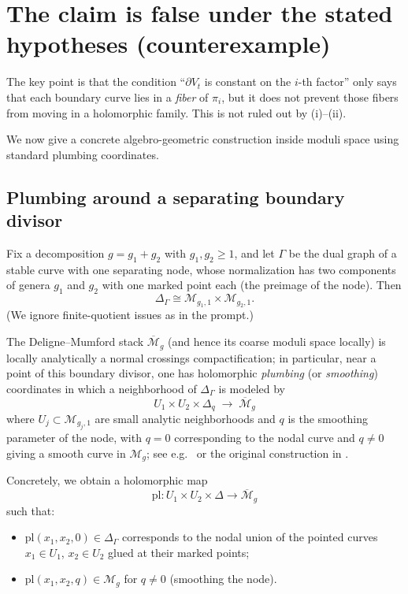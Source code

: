 \documentclass[11pt]{article}
\newcommand{\Mg}{\mathcal M_g}
\newcommand{\Mgn}[2]{\mathcal M_{#1,#2}}
\newcommand{\Mbar}{\overline{\mathcal M}_g}
\newcommand{\D}{\Delta}
\begin{document}
\section{The claim is false under the stated hypotheses (counterexample)}

The key point is that the condition ``$\partial V_t$ is constant on the $i$-th factor'' only says that each boundary curve lies in a \emph{fiber} of $\pi_i$, but it does not prevent those fibers from moving in a holomorphic family. This is not ruled out by (i)--(ii).

We now give a concrete algebro-geometric construction inside moduli space using standard plumbing coordinates.

\subsection{Plumbing around a separating boundary divisor}

Fix a decomposition $g=g_1+g_2$ with $g_1,g_2\ge 1$, and let $\Gamma$ be the dual graph of a stable curve with one separating node, whose normalization has two components of genera $g_1$ and $g_2$ with one marked point each (the preimage of the node). Then
\[
\Delta_\Gamma \cong \Mgn{g_1}{1}\times \Mgn{g_2}{1}.
\]
(We ignore finite-quotient issues as in the prompt.)

The Deligne--Mumford stack $\overline{\mathcal M}_g$ (and hence its coarse moduli space locally) is locally analytically a normal crossings compactification; in particular, near a point of this boundary divisor, one has holomorphic \emph{plumbing} (or \emph{smoothing}) coordinates in which a neighborhood of $\Delta_\Gamma$ is modeled by
\[
U_1\times U_2 \times \D_q \;\longrightarrow\; \Mbar
\]
where $U_j\subset \Mgn{g_j}{1}$ are small analytic neighborhoods and $q$ is the smoothing parameter of the node, with $q=0$ corresponding to the nodal curve and $q\neq 0$ giving a smooth curve in $\Mg$; see e.g.~\cite[Ch.~3]{HM} or the original construction in \cite{DM}.

Concretely, we obtain a holomorphic map
\[
\mathrm{pl}:U_1\times U_2 \times \D \to \Mbar
\]
such that:
\begin{itemize}
\item $\mathrm{pl}(x_1,x_2,0)\in \Delta_\Gamma$ corresponds to the nodal union of the pointed curves $x_1\in U_1$, $x_2\in U_2$ glued at their marked points;
\item $\mathrm{pl}(x_1,x_2,q)\in \Mg$ for $q\neq 0$ (smoothing the node).
\end{itemize}
\end{document}
